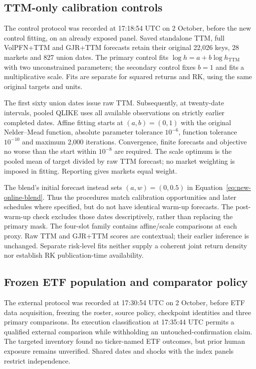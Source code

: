 \subsection{TTM-only calibration controls}

The control protocol was recorded at 17:18:54 UTC on 2 October, before the new control fitting, on an already exposed panel. Saved standalone TTM, full VolPFN+TTM and GJR+TTM forecasts retain their original 22,026 keys, 28 markets and 827 union dates. The primary control fits $\log h=a+b\log h_{\mathrm{TTM}}$ with two unconstrained parameters; the secondary control fixes $b=1$ and fits a multiplicative scale. Fits are separate for squared returns and RK, using the same original targets and units.

The first sixty union dates issue raw TTM. Subsequently, at twenty-date intervals, pooled QLIKE uses all available observations on strictly earlier completed dates. Affine fitting starts at $(a,b)=(0,1)$ with the original Nelder--Mead function, absolute parameter tolerance $10^{-6}$, function tolerance $10^{-10}$ and maximum 2,000 iterations. Convergence, finite forecasts and objective no worse than the start within $10^{-8}$ are required. The scale optimum is the pooled mean of target divided by raw TTM forecast; no market weighting is imposed in fitting. Reporting gives markets equal weight.

The blend's initial forecast instead sets $(a,w)=(0,0.5)$ in Equation~\eqref{eq:new-online-blend}. Thus the procedures match calibration opportunities and later schedules where specified, but do not have identical warm-up forecasts. The post-warm-up check excludes those dates descriptively, rather than replacing the primary mask. The four-slot family contains affine/scale comparisons at each proxy. Raw TTM and GJR+TTM scores are contextual; their earlier inference is unchanged. Separate risk-level fits neither supply a coherent joint return density nor establish RK publication-time availability.

\subsection{Frozen ETF population and comparator policy}

The external protocol was recorded at 17:30:54 UTC on 2 October, before ETF data acquisition, freezing the roster, source policy, checkpoint identities and three primary comparisons. Its execution classification at 17:35:44 UTC permits a qualified external comparison while withholding an untouched-confirmation claim. The targeted inventory found no ticker-named ETF outcomes, but prior human exposure remains unverified. Shared dates and shocks with the index panels restrict independence.

